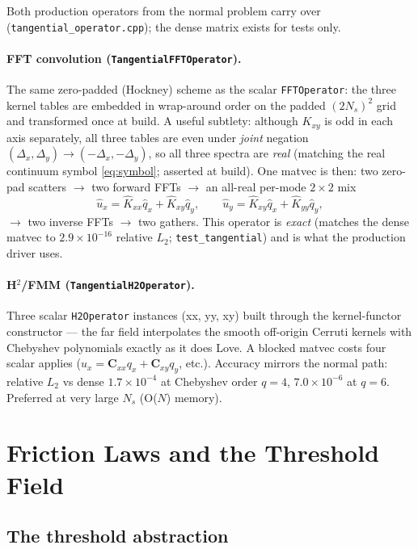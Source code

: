 \documentclass[11pt,a4paper]{article}
\newcommand{\bC}{\mathbf{C}}
\newcommand{\code}[1]{\texttt{#1}}
\begin{document}
Both production operators from the normal problem carry over
(\code{tangential\_operator.cpp}); the dense matrix exists for tests only.

\paragraph{FFT convolution (\code{TangentialFFTOperator}).}
The same zero-padded (Hockney) scheme as the scalar \code{FFTOperator}:
the three kernel tables are embedded in wrap-around order on the padded
$(2N_s)^2$ grid and transformed once at build. A useful subtlety: although
$K_{xy}$ is odd in each axis separately, all three tables are even under
\emph{joint} negation $(\Delta_x,\Delta_y) \to (-\Delta_x,-\Delta_y)$, so
all three spectra are \emph{real} (matching the real continuum symbol
\eqref{eq:symbol}; asserted at build). One matvec is then: two zero-pad
scatters $\to$ two forward FFTs $\to$ an all-real per-mode $2\times2$ mix
\begin{equation}
  \widehat u_x = \widehat K_{xx} \widehat q_x + \widehat K_{xy} \widehat q_y,
  \qquad
  \widehat u_y = \widehat K_{xy} \widehat q_x + \widehat K_{yy} \widehat q_y,
\end{equation}
$\to$ two inverse FFTs $\to$ two gathers. This operator is \emph{exact}
(matches the dense matvec to $2.9\times10^{-16}$ relative $L_2$;
\code{test\_tangential}) and is what the production driver uses.

\paragraph{H$^2$/FMM (\code{TangentialH2Operator}).}
Three scalar \code{H2Operator} instances (xx, yy, xy) built through the
kernel-functor constructor --- the far field interpolates the smooth
off-origin Cerruti kernels with Chebyshev polynomials exactly as it does
Love. A blocked matvec costs four scalar applies
($u_x = \bC_{xx} q_x + \bC_{xy} q_y$, etc.). Accuracy mirrors the normal
path: relative $L_2$ vs dense $1.7\times10^{-4}$ at Chebyshev order $q{=}4$,
$7.0\times10^{-6}$ at $q{=}6$. Preferred at very large $N_s$ (O($N$) memory).

\section{Friction Laws and the Threshold Field}
\label{sec:laws}

\subsection{The threshold abstraction}
\end{document}

